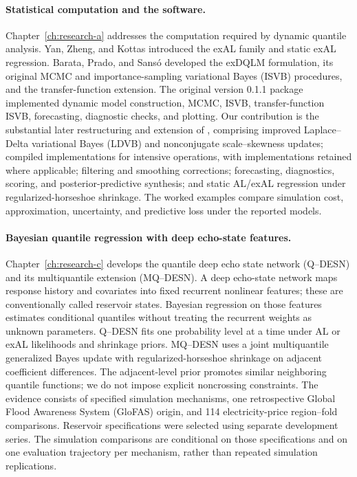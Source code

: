 \paragraph{Statistical computation and the  software.}
Chapter~\ref{ch:research-a} addresses the computation required by dynamic
quantile analysis. Yan, Zheng, and Kottas \citep{exd-yan2025family} introduced
the exAL family and static exAL regression. Barata, Prado, and Sans\'o
\citep{exd-me} developed the exDQLM formulation, its original MCMC and
importance-sampling variational Bayes (ISVB)
procedures, and the transfer-function extension. The original version 0.1.1
package implemented dynamic model construction, MCMC, ISVB,
transfer-function ISVB, forecasting, diagnostic checks, and plotting. Our
contribution is the substantial later restructuring and extension of
, comprising
improved Laplace--Delta variational Bayes (LDVB) and nonconjugate
scale--skewness updates; compiled implementations for intensive operations,
with  implementations retained where applicable; filtering and
smoothing corrections; forecasting, diagnostics, scoring, and
posterior-predictive synthesis; and static AL/exAL regression under
regularized-horseshoe shrinkage. The worked examples compare simulation cost,
approximation, uncertainty, and predictive loss under the reported models.

\paragraph{Bayesian quantile regression with deep echo-state features.}
Chapter~\ref{ch:research-c} develops the quantile deep echo state network
(Q--DESN) and its multiquantile extension (MQ--DESN). A deep echo-state
network maps response history and covariates into fixed recurrent nonlinear
features; these are conventionally called reservoir states. Bayesian
regression on those features estimates conditional quantiles without treating
the recurrent weights as unknown parameters. Q--DESN fits one probability
level at a time under AL or exAL likelihoods and shrinkage priors. MQ--DESN
uses a joint multiquantile generalized Bayes update with regularized-horseshoe
shrinkage on adjacent coefficient differences. The adjacent-level prior promotes
similar neighboring quantile functions; we do not impose explicit noncrossing
constraints. The evidence consists of
specified simulation mechanisms, one retrospective Global Flood Awareness
System (GloFAS) origin, and 114 electricity-price region--fold comparisons.
Reservoir specifications were selected using separate development series. The
simulation comparisons are conditional on those specifications and on one
evaluation trajectory per mechanism, rather than repeated simulation
replications.

